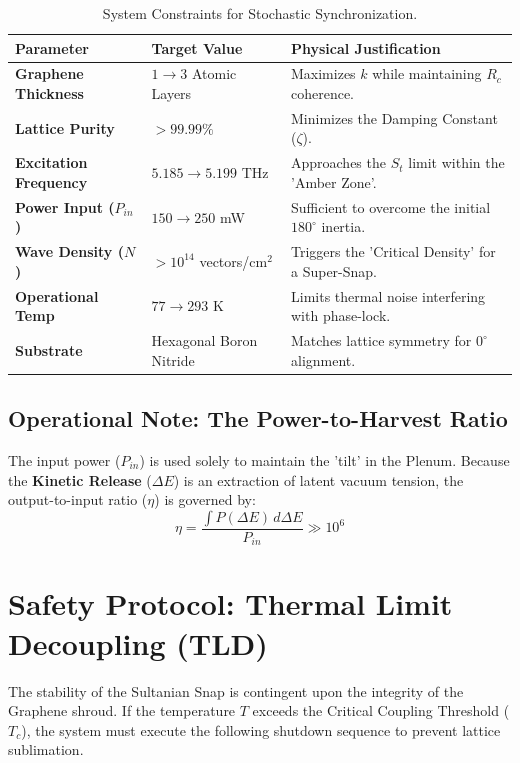 \documentclass[11pt]{article}
\begin{document}
\begin{table}[h!]
\centering
\renewcommand{\arraystretch}{1.3}
\begin{tabular}{@{}lll@{}}
\toprule
\textbf{Parameter} & \textbf{Target Value} & \textbf{Physical Justification} \\ \midrule
\textbf{Graphene Thickness} & $1 \to 3$ Atomic Layers & Maximizes $k$ while maintaining $R_c$ coherence. \\
\textbf{Lattice Purity} & $> 99.99\%$ & Minimizes the Damping Constant ($\zeta$). \\
\textbf{Excitation Frequency} & $5.185 \to 5.199$ THz & Approaches the $S_t$ limit within the 'Amber Zone'. \\
\textbf{Power Input ($P_{in}$)} & $150 \to 250$ mW & Sufficient to overcome the initial $180^\circ$ inertia. \\
\textbf{Wave Density ($N$)} & $> 10^{14}$ vectors/cm$^2$ & Triggers the 'Critical Density' for a Super-Snap. \\
\textbf{Operational Temp} & $77 \to 293$ K & Limits thermal noise interfering with phase-lock. \\
\textbf{Substrate} & Hexagonal Boron Nitride & Matches lattice symmetry for $0^\circ$ alignment. \\ \bottomrule
\end{tabular}
\caption{System Constraints for Stochastic Synchronization.}
\end{table}

\subsection*{Operational Note: The Power-to-Harvest Ratio}
The input power ($P_{in}$) is used solely to maintain the 'tilt' in the Plenum. Because the \textbf{Kinetic Release} ($\Delta E$) is an extraction of latent vacuum tension, the output-to-input ratio ($\eta$) is governed by:
\begin{equation}
    \eta = \frac{\int P(\Delta E) \, d\Delta E}{P_{in}} \gg 10^6
\end{equation}

\section*{Safety Protocol: Thermal Limit Decoupling (TLD)}

The stability of the Sultanian Snap is contingent upon the integrity of the Graphene shroud. If the temperature $T$ exceeds the Critical Coupling Threshold ($T_c$), the system must execute the following shutdown sequence to prevent lattice sublimation.
\end{document}
